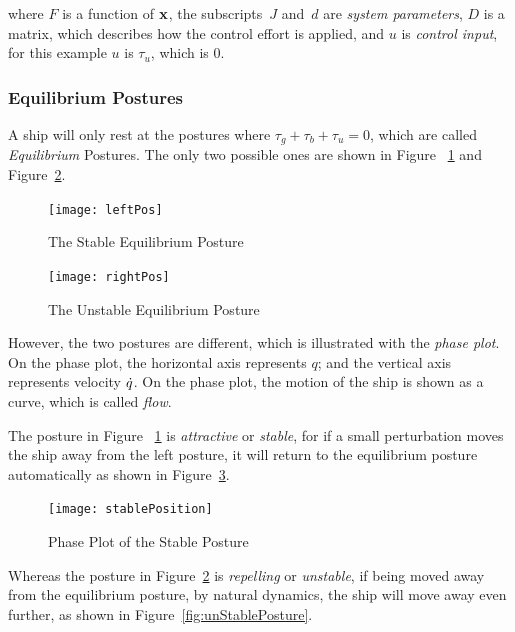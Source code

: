 where 
$F$ is a function of $\mathbf{x}$, the subscripts~$J$ and~$d$ are \emph{system parameters},
$D$ is a matrix, which describes how the control effort is applied,
and $u$ is \emph{control input}, for this example $u$ is $\tau_{u}$, which is $0$.



\subsubsection*{Equilibrium Postures}
A ship will only rest at the postures where $\tau_{g}+\tau_{b}+\tau_{u}=0$, which are called \emph{Equilibrium} Postures.
The only two possible ones are shown in Figure ~\ref{fig:ShipEqulibriumStable} and Figure~\ref{fig:ShipEqulibriumUnstable}.
\begin{figure}[!htbp]
  \begin{center}
     \texttt{[image: leftPos]}
    \caption{The Stable Equilibrium Posture}
    \label{fig:ShipEqulibriumStable}
  \end{center}
\end{figure}

\begin{figure}[!htbp]
  \begin{center}
     \texttt{[image: rightPos]}
    \caption{The Unstable Equilibrium Posture}
    \label{fig:ShipEqulibriumUnstable}
  \end{center}
\end{figure}



However, the two postures are different, which is illustrated with the \emph{phase plot}.
On the phase plot, the horizontal axis represents  $q$; and the vertical axis represents velocity $\dot{q}$. 
On the phase plot, the motion of the ship is shown as a curve, which is called \emph{flow}.

The posture in Figure ~\ref{fig:ShipEqulibriumStable} is \emph{attractive} or \emph{stable},
for if a small perturbation moves the ship away from the left posture, it will return to the equilibrium posture automatically as shown in Figure~\ref{fig:StablePosture}.
\begin{figure}[!htbp]
  \begin{center}
      \texttt{[image: stablePosition]}
    \caption{Phase Plot of the Stable Posture}
    \label{fig:StablePosture}
  \end{center}
\end{figure}


Whereas the  posture in Figure~\ref{fig:ShipEqulibriumUnstable} is \emph{repelling} or \emph{unstable}, if being moved away from the equilibrium posture, by natural dynamics, the ship will move away even further, as shown in Figure~\ref{fig:unStablePosture}.

